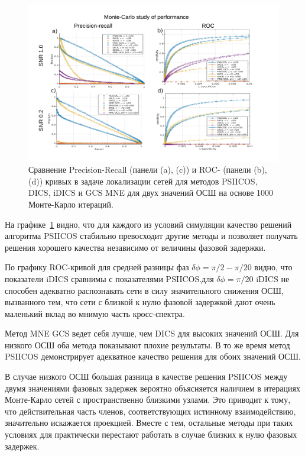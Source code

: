  \begin{figure}[!ht]
 \includegraphics[width=1\textwidth]{../images/psiicos_paper/Figure4_hr_labelled_pans.jpg}
 \caption{Сравнение Precision-Recall (панели (a), (c))  и ROC- (панели (b), (d)) кривых
     в задаче локализации сетей для методов PSIICOS, DICS, iDICS и GCS MNE для
     двух значений ОСШ на основе 1000 Монте-Карло итераций.}\label{fig:04} %
\end{figure}%

На графике~\ref{fig:04} видно, что для каждого из условий симуляции качество решений
алгоритма PSIICOS стабильно превосходит другие методы и позволяет получать решения хорошего
качества независимо от величины фазовой задержки.

По графику ROC-кривой для средней разницы фаз $\delta\phi=\pi/2 - \pi/20$ видно, что
показатели iDICS сравнимы с показателями PSIICOS. для $\delta\phi = \pi/20$ iDICS
не способен адекватно распознавать сети в силу значительного снижения ОСШ, вызванного
тем, что сети с близкой к нулю фазовой задержкой дают очень маленький вклад во
мнимую часть кросс-спектра.

Метод MNE GCS ведет себя лучше, чем DICS для высоких значений ОСШ. Для низкого ОСШ
оба метода показывают плохие результаты. В то же время метод PSIICOS демонстрирует
адекватное качество решения для обоих значений ОСШ.

В случае низкого ОСШ большая разница в качестве решения PSIICOS между двумя
значениями фазовых задержек вероятно объясняется наличием в итерациях
Монте-Карло сетей с пространственно близкими узлами. Это приводит к тому, что
действительная часть членов, соответствующих истинному взаимодействию,
значительно искажается проекцией. Вместе с тем, остальные методы при таких
условиях для практически перестают работать в случае близких к нулю фазовых задержек.

